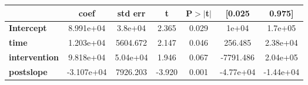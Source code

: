 \begin{center}
\begin{tabular}{lcccccc}
\toprule
                      & \textbf{coef} & \textbf{std err} & \textbf{t} & \textbf{P$> |$t$|$} & \textbf{[0.025} & \textbf{0.975]}  \\
\midrule
\textbf{Intercept}    &    8.991e+04  &      3.8e+04     &     2.365  &         0.029        &        1e+04    &      1.7e+05     \\
\textbf{time}         &    1.203e+04  &     5604.672     &     2.147  &         0.046        &      256.485    &     2.38e+04     \\
\textbf{intervention} &    9.818e+04  &     5.04e+04     &     1.946  &         0.067        &    -7791.486    &     2.04e+05     \\
\textbf{postslope}    &   -3.107e+04  &     7926.203     &    -3.920  &         0.001        &    -4.77e+04    &    -1.44e+04     \\
\bottomrule
\end{tabular}
\end{center}
